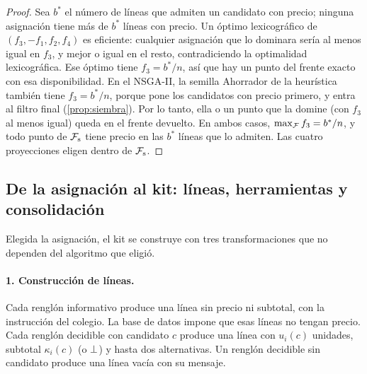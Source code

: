 \begin{proof}
Sea $b^\ast$ el número de líneas que admiten un candidato con precio; ninguna
asignación tiene más de $b^\ast$ líneas con precio. Un óptimo lexicográfico de
$(f_3,-f_1,f_2,f_4)$ es eficiente: cualquier asignación que lo dominara sería
al menos igual en $f_3$, y mejor o igual en el resto, contradiciendo la
optimalidad lexicográfica. Ese óptimo tiene $f_3=b^\ast/n$, así que hay un
punto del frente exacto con esa disponibilidad. En el NSGA-II, la semilla
Ahorrador de la heurística también tiene $f_3=b^\ast/n$, porque pone los
candidatos con precio primero, y entra al filtro final
(\cref{prop:siembra}). Por lo tanto, ella o un punto que la domine (con $f_3$
al menos igual) queda en el frente devuelto. En ambos casos,
$\max_{\mathcal{F}}f_3=b^\ast/n$, y todo punto de $\mathcal{F}_{\mathrm{s}}$ tiene precio
en las $b^\ast$ líneas que lo admiten. Las cuatro proyecciones eligen dentro de
$\mathcal{F}_{\mathrm{s}}$.
\end{proof}

\subsection{De la asignación al kit: líneas, herramientas y consolidación}
\label{sec:opt-lineas}

Elegida la asignación, el kit se construye con tres transformaciones que no
dependen del algoritmo que eligió.

\paragraph{1. Construcción de líneas.} Cada renglón informativo produce una
línea sin precio ni subtotal, con la instrucción del colegio. La base de datos
impone que esas líneas no tengan precio. Cada renglón decidible con candidato
$c$ produce una línea con $u_i(c)$ unidades, subtotal $\kappa_i(c)$ (o
$\bot$) y hasta dos alternativas. Un renglón decidible sin candidato
produce una línea vacía con su mensaje.

